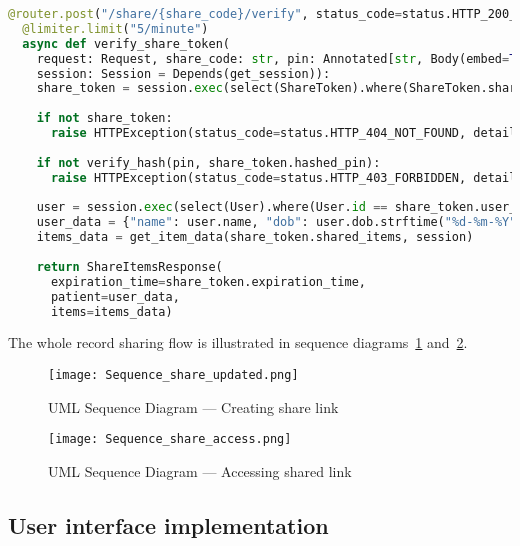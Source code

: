 \begin{lstlisting}[language=Python, caption=Share Link Endpoint]
  @router.post("/share/{share_code}/verify", status_code=status.HTTP_200_OK, response_model=ShareItemsResponse)
  @limiter.limit("5/minute")
  async def verify_share_token(
    request: Request, share_code: str, pin: Annotated[str, Body(embed=True)],
    session: Session = Depends(get_session)):
    share_token = session.exec(select(ShareToken).where(ShareToken.share_code == share_code)).first()
    
    if not share_token:
      raise HTTPException(status_code=status.HTTP_404_NOT_FOUND, detail="Share token not found")
    
    if not verify_hash(pin, share_token.hashed_pin):
      raise HTTPException(status_code=status.HTTP_403_FORBIDDEN, detail="Invalid PIN")
    
    user = session.exec(select(User).where(User.id == share_token.user_id)).first()
    user_data = {"name": user.name, "dob": user.dob.strftime("%d-%m-%Y") if user.dob else None}
    items_data = get_item_data(share_token.shared_items, session)
    
    return ShareItemsResponse(
      expiration_time=share_token.expiration_time,
      patient=user_data,
      items=items_data)
\end{lstlisting}

The whole record sharing flow is illustrated in sequence diagrams~\ref{fig:sequence_share_updated} and~\ref{fig:sequence_share_access}.

\begin{figure}[htbp]
  \centering
  \texttt{[image: Sequence\_share\_updated.png]}
  \caption{UML Sequence Diagram --- Creating share link}\label{fig:sequence_share_updated}
\end{figure}

\begin{figure}[htbp]
  \centering
  \texttt{[image: Sequence\_share\_access.png]}
  \caption{UML Sequence Diagram --- Accessing shared link}\label{fig:sequence_share_access}
\end{figure}

\FloatBarrier{}

\subsection{User interface implementation}

